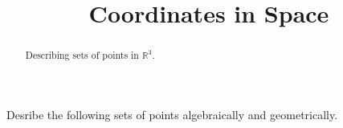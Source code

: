 \documentclass{ximera}
\title{Coordinates in Space}
\begin{document}
\begin{abstract}
Describing sets of points in $\mathbb{R}^3$.
\end{abstract}
\maketitle


Desribe the following sets of points algebraically and geometrically.
\end{document}
